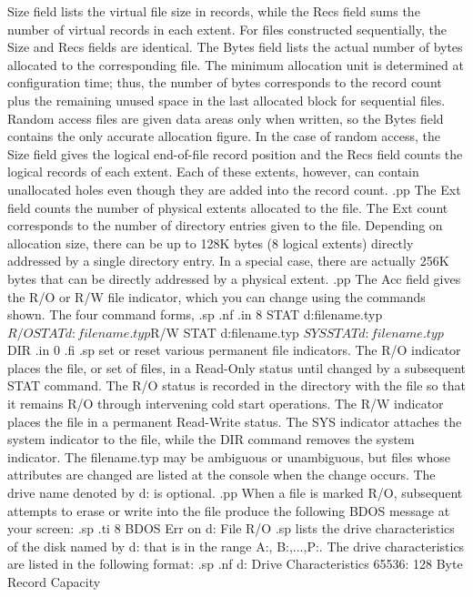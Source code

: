 Size field lists the virtual file size in records, while the Recs field
sums the number of virtual records in each extent.  For files constructed
sequentially, the Size and Recs fields are identical.  The Bytes field
lists the actual number of bytes allocated to the corresponding file.  The
minimum allocation unit is determined at configuration time; thus, the number
of bytes corresponds to the record count plus the remaining unused space in
the last allocated block for sequential files.  Random access files are given
data areas only when written, so the Bytes field contains the only accurate
allocation figure.  In the case of random access, the Size field gives the
logical end-of-file record position and the Recs field counts the logical
records of each extent.  Each of these extents, however, can contain
unallocated holes even though they are added into the record count.
.pp
The Ext field counts the number of physical extents allocated to the file.
The Ext count corresponds to the number of directory entries given to the
file.  Depending on allocation size, there can be up to 128K 
bytes (8 logical extents) directly addressed by a single directory entry.  In a special case,
there are actually 256K bytes that can be directly addressed by a physical
extent.
.pp
The Acc field gives the R/O or R/W file indicator, which you can 
change using the commands shown.  The four command forms,
.sp
.nf
.in 8
STAT d:filename.typ $R/O
STAT d:filename.typ $R/W
STAT d:filename.typ $SYS
STAT d:filename.typ $DIR
.in 0
.fi
.sp
set or reset various permanent file indicators.  The R/O indicator places the
file, or set of files, in a Read-Only status until changed by a subsequent
STAT command.  The R/O status is recorded in the directory with the file so
that it remains R/O through intervening cold start operations.  The R/W
indicator places the file in a permanent Read-Write status.  The SYS
indicator attaches the system indicator to the file, while the DIR command
removes the system indicator.  The filename.typ may be ambiguous or
unambiguous, but files whose attributes are changed are listed at the console
when the change occurs.  The drive name denoted by d: is optional.
.pp
When a file is marked R/O, subsequent attempts to erase or write into the
file produce the following BDOS message at your screen:
.sp
.ti 8
BDOS Err on d: File R/O
.sp
lists the drive characteristics of the disk named by d: that is in the range
A:, B:,...,P:.  The drive characteristics are listed in the 
following format:
.sp
.nf
            d: Drive Characteristics
        65536: 128 Byte Record Capacity
